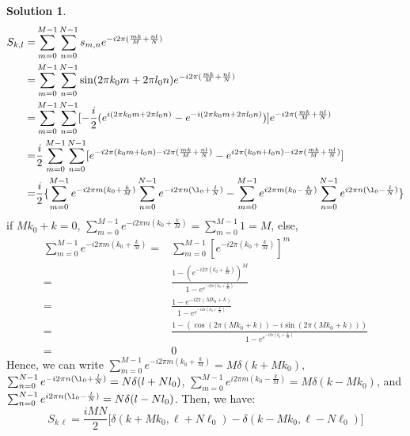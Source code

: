 \documentclass[11pt]{article}
\theoremstyle{plain}
\theoremstyle{definition}
\newtheorem{solution}{Solution}
\theoremstyle{remark}
\begin{document}
\begin{solution}
	\begin{eqnarray*}
		S_{k,l} =& \sum_{m=0}^{M-1} \sum_{n=0}^{N-1} s_{m,n} e^{-i 2\pi (\frac{mk}{M} + \frac{nl}{N})}\\
		=& \sum_{m=0}^{M-1} \sum_{n=0}^{N-1} \sin(2\pi k_0 m+2\pi l_0 n) e^{-i 2\pi (\frac{mk}{M} + \frac{nl}{N})}\\
		=& \sum_{m=0}^{M-1} \sum_{n=0}^{N-1} [-\frac{i}{2}(e^{i(2\pi k_0 m + 2\pi l_0 n)} - e^{-i(2\pi k_0 m + 2\pi l_0 n)})]e^{-i 2\pi (\frac{mk}{M} + \frac{nl}{N})}\\
		=& \frac{i}{2} \sum_{m=0}^{M-1} \sum_{n=0}^{N-1}  [e^{-i2\pi (k_0 m + l_0 n )-i2\pi(\frac{mk}{M}+\frac{nl}{N})} - e^{i2\pi (k_0 n + l_0 n) - i2\pi (\frac{mk}{M}+\frac{nl}{N})}]\\
		=&\frac{i}{2}\{ \sum_{m=0}^{M-1} e^{-i2\pi m (k_0+\frac{k}{M})}\sum_{n=0}^{N-1} e^{-i2\pi n(\l_0 + \frac{l}{N})} - \sum_{m=0}^{M-1} e^{i2\pi m (k_0-\frac{k}{M})}\sum_{n=0}^{N-1} e^{i2\pi n(\l_0 - \frac{l}{N})} \}
	\end{eqnarray*}
	if $Mk_0 + k=0$, $\sum_{m=0}^{M-1} e^{-i2\pi m (k_0+\frac{k}{M})} = \sum_{m=0}^{M-1} 1 = M$, else, 
	\begin{eqnarray*}
		\sum_{m=0}^{M-1} e^{-i2\pi m (k_0+\frac{k}{M})} =&\sum_{m=0}^{M-1} [e^{-i2\pi  (k_0+\frac{k}{M})}]^m\\
		=& \frac{1 - (e^{-i2\pi  (k_0+\frac{k}{M})})^M}{1-e^{e^{-i2\pi  (k_0+\frac{k}{M})}}}\\
		=& \frac{1 - e^{-i2\pi  (Mk_0+k)}}{1-e^{e^{-i2\pi  (k_0+\frac{k}{M})}}}\\
		=& \frac{1 - (\cos(2\pi  (Mk_0+k)) -i \sin(2\pi  (Mk_0+k)))}{1-e^{e^{-i2\pi  (k_0+\frac{k}{M})}}}\\
		=& 0
	\end{eqnarray*}
	Hence, we can write $\sum_{m=0}^{M-1} e^{-i2\pi m (k_0+\frac{k}{M})} = M\delta(k+Mk_0) $, $\sum_{n=0}^{N-1} e^{-i2\pi n(\l_0 + \frac{l}{N})} =N\delta(l+Nl_0)$, $\sum_{m=0}^{M-1} e^{i2\pi m (k_0-\frac{k}{M})} = M\delta(k-Mk_0)$, and $\sum_{n=0}^{N-1} e^{i2\pi n(\l_0 - \frac{l}{N})} = N\delta(l-Nl_0)$. Then, we have:
	$$S_{k\,\ell}=\frac{iMN}{2}\big[\delta(k+Mk_0,\ell+N\ell_0)
	-\delta(k-Mk_0,\ell-N\ell_0)\big]$$
\end{solution}
\end{document}
